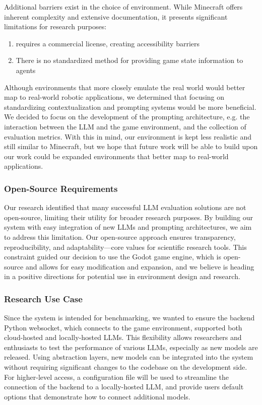 \documentclass{article}
\begin{document}
Additional barriers exist in the choice of environment.
While Minecraft offers inherent complexity and extensive documentation, it presents significant limitations for research purposes:
\begin{enumerate}
    \item requires a commercial license, creating accessibility barriers
    \item There is no standardized method for providing game state information to agents
\end{enumerate}
Although environments that more closely emulate the real world would better map to real-world robotic applications, we determined that focusing on standardizing contextualization and prompting systems would be more beneficial.
We decided to focus on the development of the prompting architecture, e.g. the interaction between the LLM and the game environment, and the collection of evaluation metrics.
With this in mind, our environment is kept less realistic and still similar to Minecraft, but we hope that future work will be able to build upon our work could be expanded environments that better map to real-world applications.


\subsubsection{Open-Source Requirements}
Our research identified that many successful LLM evaluation solutions are not open-source, limiting their utility for broader research purposes.
By building our system with easy integration of new LLMs and prompting architectures, we aim to address this limitation.
Our open-source approach ensures transparency, reproducibility, and adaptability—core values for scientific research tools.
This constraint guided our decision to use the Godot game engine, which is open-source and allows for easy modification and expansion, and we believe is heading in a positive directions for potential use in environment design and research.

\subsubsection{Research Use Case}
Since the system is intended for benchmarking, we wanted to ensure the backend Python websocket, which connects to the game environment, supported both cloud-hosted and locally-hosted LLMs.
This flexibility allows researchers and enthusiasts to test the performance of various LLMs, especially as new models are released.
Using abstraction layers, new models can be integrated into the system without requiring significant changes to the codebase on the development side.
For higher-level access, a configuration file will be used to streamline the connection of the backend to a locally-hosted LLM, and provide users default options that demonstrate how to connect additional models.
\end{document}
